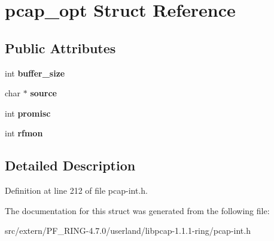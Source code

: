 \hypertarget{structpcap__opt}{
\section{pcap\_\-opt Struct Reference}
\label{structpcap__opt}
}
\subsection*{Public Attributes}
\begin{DoxyCompactItemize}
\item 
\hypertarget{structpcap__opt_acdbf4883cdc32c628f4041c7aa6ef4cf}{
int {\bfseries buffer\_\-size}}
\label{structpcap__opt_acdbf4883cdc32c628f4041c7aa6ef4cf}

\item 
\hypertarget{structpcap__opt_a25b0f2ee28af36929ba1b0c00702bc10}{
char $\ast$ {\bfseries source}}
\label{structpcap__opt_a25b0f2ee28af36929ba1b0c00702bc10}

\item 
\hypertarget{structpcap__opt_aa3652c9673588c1c2d94f6531d8a8a92}{
int {\bfseries promisc}}
\label{structpcap__opt_aa3652c9673588c1c2d94f6531d8a8a92}

\item 
\hypertarget{structpcap__opt_a61ccd41a76af5412bb8129ed6842510e}{
int {\bfseries rfmon}}
\label{structpcap__opt_a61ccd41a76af5412bb8129ed6842510e}

\end{DoxyCompactItemize}


\subsection{Detailed Description}


Definition at line 212 of file pcap-\/int.h.



The documentation for this struct was generated from the following file:\begin{DoxyCompactItemize}
\item 
src/extern/PF\_\-RING-\/4.7.0/userland/libpcap-\/1.1.1-\/ring/pcap-\/int.h\end{DoxyCompactItemize}
